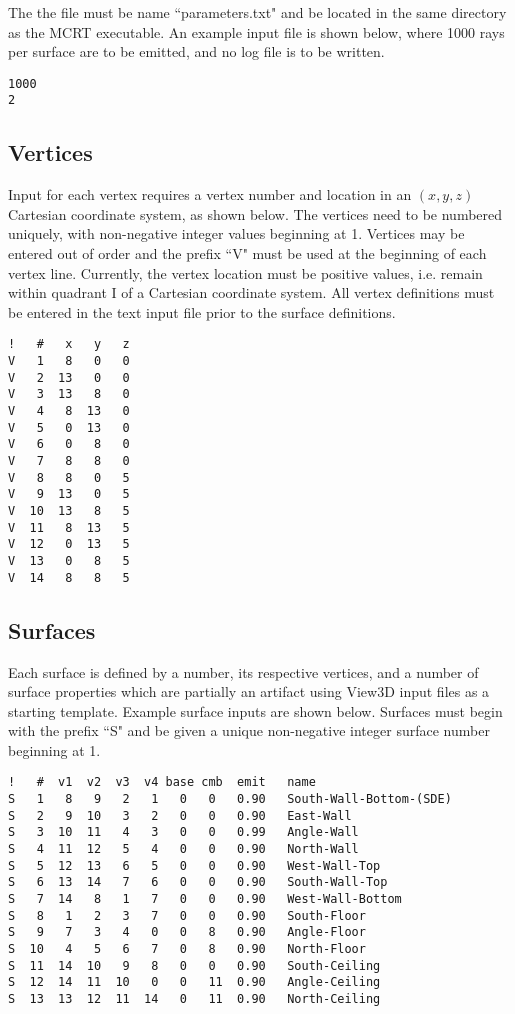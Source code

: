 \documentclass{article}
\begin{document}
The the file must be name ``parameters.txt" and be located in the same directory as the MCRT executable. An example input file is shown below, where 1000 rays per surface are to be emitted, and no log file is to be written.

\begin{lstlisting}
1000
2
\end{lstlisting}

\subsection{Vertices}
\label{subsec:verts}

Input for each vertex requires a vertex number and location in an $(x,y,z)$ Cartesian coordinate system, as shown below. The vertices need to be numbered uniquely, with non-negative integer values beginning at 1. Vertices may be entered out of order and the prefix ``V" must be used at the beginning of each vertex line. Currently, the vertex location must be positive values, i.e. remain within quadrant I of a Cartesian coordinate system. All vertex definitions must be entered in the text input file prior to the surface definitions.

\begin{lstlisting}
!   #   x   y   z
V   1   8   0   0
V   2  13   0   0
V   3  13   8   0
V   4   8  13   0
V   5   0  13   0
V   6   0   8   0
V   7   8   8   0
V   8   8   0   5
V   9  13   0   5
V  10  13   8   5
V  11   8  13   5
V  12   0  13   5
V  13   0   8   5
V  14   8   8   5
\end{lstlisting}

\subsection{Surfaces}
\label{subsec:surfs}
Each surface is defined by a number, its respective vertices, and a number of surface properties which are partially an artifact using View3D input files as a starting template. Example surface inputs are shown below. Surfaces must begin with the prefix ``S" and be given a unique non-negative integer surface number beginning at 1.

\begin{lstlisting}
!   #  v1  v2  v3  v4 base cmb  emit   name
S   1   8   9   2   1   0   0   0.90   South-Wall-Bottom-(SDE)
S   2   9  10   3   2   0   0   0.90   East-Wall
S   3  10  11   4   3   0   0   0.99   Angle-Wall
S   4  11  12   5   4   0   0   0.90   North-Wall
S   5  12  13   6   5   0   0   0.90   West-Wall-Top
S   6  13  14   7   6   0   0   0.90   South-Wall-Top
S   7  14   8   1   7   0   0   0.90   West-Wall-Bottom
S   8   1   2   3   7   0   0   0.90   South-Floor
S   9   7   3   4   0   0   8   0.90   Angle-Floor
S  10   4   5   6   7   0   8   0.90   North-Floor
S  11  14  10   9   8   0   0   0.90   South-Ceiling
S  12  14  11  10   0   0   11  0.90   Angle-Ceiling
S  13  13  12  11  14   0   11  0.90   North-Ceiling
\end{lstlisting}
\end{document}
